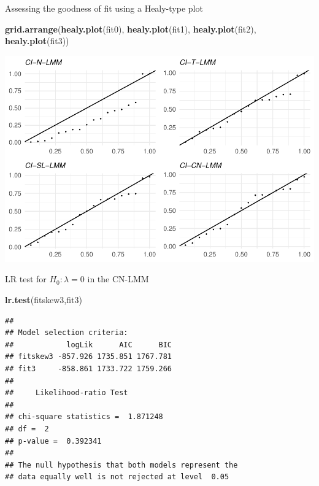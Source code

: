 \documentclass[
  ignorenonframetext,
]{beamer}
\newenvironment{Shaded}{\begin{snugshade}}{\end{snugshade}}
\newcommand{\KeywordTok}[1]{\textcolor[rgb]{0.13,0.29,0.53}{\textbf{#1}}}
\newcommand{\NormalTok}[1]{#1}
\begin{document}
\begin{frame}[fragile]{Assessing the goodness of fit using a Healy-type
plot}
\protect\hypertarget{assessing-the-goodness-of-fit-using-a-healy-type-plot}{}

\small

\begin{Shaded}
\begin{Highlighting}[]
\KeywordTok{grid.arrange}\NormalTok{(}\KeywordTok{healy.plot}\NormalTok{(fit0),}
            \KeywordTok{healy.plot}\NormalTok{(fit1),}
            \KeywordTok{healy.plot}\NormalTok{(fit2),}
            \KeywordTok{healy.plot}\NormalTok{(fit3))}
\end{Highlighting}
\end{Shaded}

\begin{center}\includegraphics[width=0.85\linewidth]{codes_files/figure-beamer/healy1-1} \end{center}

\end{frame}

\begin{frame}[fragile]{LR test for \(H_0: \lambda=0\) in the CN-LMM}
\protect\hypertarget{lr-test-for-h_0-lambda0-in-the-cn-lmm}{}

\begin{Shaded}
\begin{Highlighting}[]
\KeywordTok{lr.test}\NormalTok{(fitskew3,fit3)}
\end{Highlighting}
\end{Shaded}

\begin{verbatim}
## 
## Model selection criteria:
##            logLik      AIC      BIC
## fitskew3 -857.926 1735.851 1767.781
## fit3     -858.861 1733.722 1759.266
## 
##     Likelihood-ratio Test
## 
## chi-square statistics =  1.871248 
## df =  2 
## p-value =  0.392341 
## 
## The null hypothesis that both models represent the 
## data equally well is not rejected at level  0.05
\end{verbatim}

\end{frame}
\end{document}
